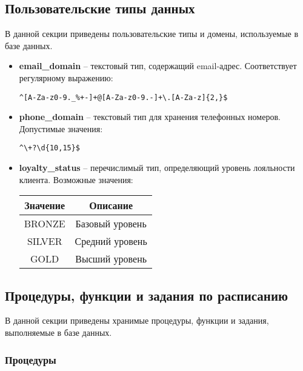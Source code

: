 \subsection{Пользовательские типы данных}\label{subsec:usertypes}

В данной секции приведены пользовательские типы и домены, используемые в базе данных.

\begin{itemize}
    \item \textbf{email\_domain} – текстовый тип, содержащий email-адрес.
    Соответствует регулярному выражению:
    \begin{verbatim}
^[A-Za-z0-9._%+-]+@[A-Za-z0-9.-]+\.[A-Za-z]{2,}$
    \end{verbatim}

    \item \textbf{phone\_domain} – текстовый тип для хранения телефонных номеров.
    Допустимые значения:
    \begin{verbatim}
^\+?\d{10,15}$
    \end{verbatim}

    \item \textbf{loyalty\_status} – перечислимый тип, определяющий уровень лояльности клиента.
    Возможные значения:
    \begin{center}
        \begin{tabular}{|c|c|}
            \hline
            Значение & Описание        \\
            \hline
            BRONZE   & Базовый уровень \\
            SILVER   & Средний уровень \\
            GOLD     & Высший уровень  \\
            \hline
        \end{tabular}
    \end{center}
\end{itemize}

\subsection{Процедуры, функции и задания по расписанию}\label{subsec:procedures}

В данной секции приведены хранимые процедуры, функции и задания, выполняемые в базе данных.

\subsubsection{Процедуры}

